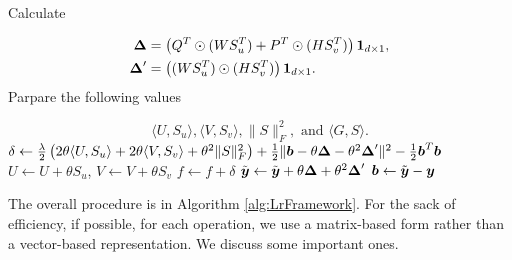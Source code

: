 \begin{algorithm}[t]
\begin{algorithmic}[1]
            \State Calculate\par 
            \begin{align}
            	\begin{split}
            	\boldsymbol{\Delta} &= \left( Q^T \odot (WS_u^T)+ P^T\odot (HS_v^T) \right)\boldsymbol{1}_{d\times 1},\nonumber\\
            	\boldsymbol{\Delta}^\prime &= \left( (WS_u^T) \odot (HS_v^T) \right)\boldsymbol{1}_{d\times 1}.
            	\end{split}
            \end{align}\label{alg:LrFramework:compD}
            \State Parpare the following values\par
            \begin{equation*}
            \langle{U}{,}{S_u}\rangle,\langle{V}{,}{S_v}\rangle,\|S\|_F^2,\text{ and } \langle{G}{,}{S}\rangle.
            \end{equation*}\label{alg:LrFramework:compGS}
                \State $\delta \gets \frac{\lambda}{2}\left( 2\theta \langle U, S_u \rangle + 2\theta \langle V, S_v \rangle + \theta^2\|S\|_F^2 \right) 
                + \frac{1}{2} \|\boldsymbol{b}-\theta \boldsymbol{\Delta}-{\theta}^2 \boldsymbol{\Delta}^\prime \|^2
                - \frac{1}{2}\boldsymbol{b}^T \boldsymbol{b}$\label{alg:LrFramework:compd}
                    \State $U \gets U +\theta S_u$, $V \gets V +\theta S_v$
                    \State $f \gets f+ \delta$
                    \State $\tilde{\boldsymbol{y}} \gets \tilde{\boldsymbol{y}}+\theta\boldsymbol{\Delta} +{\theta}^2 \boldsymbol{\Delta}^\prime$
                    \State $\boldsymbol{b} \leftarrow \tilde{\boldsymbol{y}} - \boldsymbol{y} $
                \EndIf
            \EndFor
        \EndFor
    \end{algorithmic}
\end{algorithm}
The overall procedure is in Algorithm \ref{alg:LrFramework}. For the sack of efficiency, if possible, for each operation, we use a matrix-based form rather than a vector-based representation. We discuss some important ones. 


